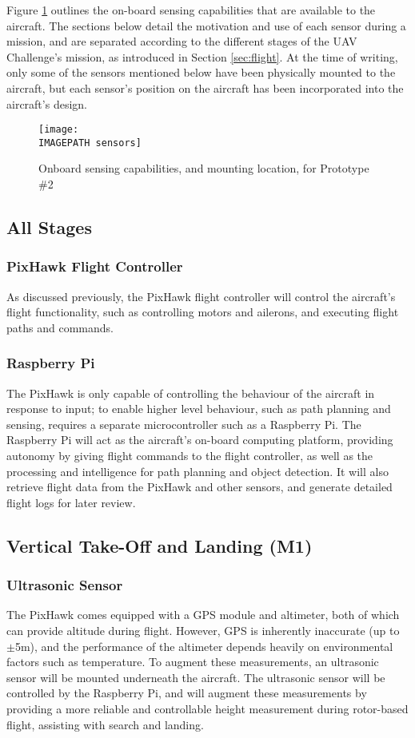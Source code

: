 \label{sec:sensing}
Figure \ref{fig:sensing} outlines the on-board sensing capabilities that are available to the aircraft. The sections below detail the motivation and use of each sensor during a mission, and are separated according to the different stages of the UAV Challenge's mission, as introduced in Section \ref{sec:flight}. At the time of writing, only some of the sensors mentioned below have been physically mounted to the aircraft, but each sensor's position on the aircraft has been incorporated into the aircraft's design.

\begin{figure}[!ht]
	\centering
	\texttt{[image: \\IMAGEPATH sensors]}
	\caption{Onboard sensing capabilities, and mounting location, for Prototype \#2}
	\label{fig:sensing}
\end{figure}

\subsection{All Stages}

\subsubsection*{PixHawk Flight Controller}
As discussed previously, the PixHawk flight controller will control the aircraft's flight functionality, such as controlling motors and ailerons, and executing flight paths and commands.

\subsubsection*{Raspberry Pi}
The PixHawk is only capable of controlling the behaviour of the aircraft in response to input; to enable higher level behaviour, such as path planning and sensing, requires a separate microcontroller such as a Raspberry Pi. The Raspberry Pi will act as the aircraft's on-board computing platform, providing autonomy by giving flight commands to the flight controller, as well as the processing and intelligence for path planning and object detection. It will also retrieve flight data from the PixHawk and other sensors, and generate detailed flight logs for later review.

\subsection{Vertical Take-Off and Landing (M1)}
\subsubsection*{Ultrasonic Sensor}
The PixHawk comes equipped with a GPS module and altimeter, both of which can provide altitude during flight. However, GPS is inherently inaccurate (up to $\pm$5m), and the performance of the altimeter depends heavily on environmental factors such as temperature. To augment these measurements, an ultrasonic sensor will be mounted underneath the aircraft. The ultrasonic sensor will be controlled by the Raspberry Pi, and will augment these measurements by providing a more reliable and controllable height measurement during rotor-based flight, assisting with search and landing.

